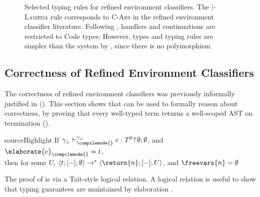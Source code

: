 \begin{figure}
\begin{source-desc}
\begin{center}
\end{center}
\end{source-desc}

\caption{Selected typing rules for refined environment classifiers. The \compilemode{}$\mid$\quotemode{}-\textsc{Lambda} rule corresponds to \textsc{C-Abs} in the refined environment classifier literature. Following \citeauthor{isoda-24}, handlers and continuations are restricted to \textsf{Code} types; However, types and typing rules are simpler than the system by \citeauthor{isoda-24}, since there is no polymorphism.}
\label{fig:refined-env-classifiers-source-typing-rules}
\end{figure}

\subsection{Correctness of Refined Environment Classifiers}\label{subsection:rec-formal-correctness}
The correctness of refined environment classifiers was previously informally justified in  (). This section shows that \calculusName{} can be used to formally reason about correctness, by proving that every well-typed \sourceLang{} term returns a well-scoped AST on termination (). 

\begin{theorem}{sourceHighlight}\label{thm:refined-env-classifiers-correct}
If $\gamma_\bot \vdash ^{\gamma_\bot}_{\compilemode{}} e: T^0 \, ! \, \emptyset ; \emptyset $, and $\elaborate{e}_{\compilemode{}} = t$, \\
\noindent{}then for some $U$, $\langle t;[-]; \emptyset \rangle \to^{*} \langle \return{n}; [-] ; U \rangle$, and $\freevars{n} = \emptyset$
\end{theorem}

The proof of  is via a Tait-style logical relation. A logical relation is useful to show that typing guarantees are maintained by elaboration \citep{benton-09}.

